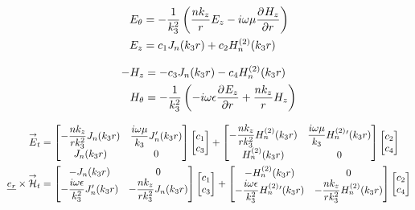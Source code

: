 \begin{align}
    E_\theta &= -\frac{1}{k_3^2}\left(\frac{nk_z}{r}E_z - i\w\mu\ddr{r}{H_z}\right)
    \\
    E_z &= c_1 J_n(k_3 r) + c_2 H_n^{(2)}(k_3 r)
\end{align}

\begin{align}
    -H_z &= -c_3 J_n(k_3 r) - c_4 H_n^{(2)}(k_3 r)
    \\
    H_\theta &= -\frac{1}{k_3^2}\left(-i\w\eps\ddr{r}{E_z} + \frac{nk_z}{r}H_z\right)
\end{align}

\begin{align}
\vE_t &= 
\begin{bmatrix}
    -\frac{nk_z}{rk_3^2}J_n(k_3r) & \frac{i\w\mu}{k_3}J_n'(k_3r)
    \\
    J_n(k_3r) & 0
\end{bmatrix}
\begin{bmatrix}
c_1 \\
c_3
\end{bmatrix}
+
\begin{bmatrix}
    -\frac{nk_z}{rk_3^2}H_n^{(2)}(k_3r) & \frac{i\w\mu}{k_3}H_n^{(2)}{}'(k_3r)
    \\
    H_n^{(2)}(k_3r) & 0
\end{bmatrix}
\begin{bmatrix}
c_2 \\
c_4
\end{bmatrix}
\\
\v{e_r}\times\vH_t &= 
\begin{bmatrix}
    -J_n(k_3r) & 0
    \\
    -\frac{i\w\eps}{k_3^2}J_n'(k_3r) & -\frac{nk_z}{rk_3^2}J_n(k_3r)
\end{bmatrix}
\begin{bmatrix}
c_1 \\
c_3
\end{bmatrix}
+
\begin{bmatrix}
    -H_n^{(2)}(k_3r) & 0
    \\
    -\frac{i\w\eps}{k_3^2}H_n^{(2)}{}'(k_3r) & -\frac{nk_z}{rk_3^2}H_n^{(2)}(k_3r)
\end{bmatrix}
\begin{bmatrix}
c_2 \\
c_4
\end{bmatrix}
\end{align}